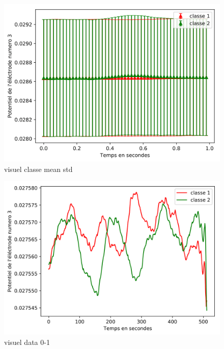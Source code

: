 \documentclass{article}
\begin{document}
\begin{figure}[H]
\begin{center}
\includegraphics[scale=0.2]{images/visuel_classe_mean_std-1.png}
\end{center}
\caption{visuel classe mean std}
\end{figure}

\begin{figure}[H]
\begin{center}
\includegraphics[scale=0.2]{images/visuel_data_0-1.png}
\end{center}
\caption{visuel data 0-1}
\end{figure}
\end{document}
